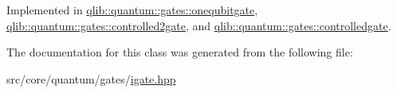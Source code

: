 Implemented in \hyperlink{classqlib_1_1quantum_1_1gates_1_1onequbitgate_a280c7a7d29032eeb95afcb3d6668e7db}{qlib\+::quantum\+::gates\+::onequbitgate}, \hyperlink{classqlib_1_1quantum_1_1gates_1_1controlled2gate_a272635da6a7b8f65379f6ecb42df9389}{qlib\+::quantum\+::gates\+::controlled2gate}, and \hyperlink{classqlib_1_1quantum_1_1gates_1_1controlledgate_aec6e423cc6ae442c5c3c5dc04581959e}{qlib\+::quantum\+::gates\+::controlledgate}.



The documentation for this class was generated from the following file\+:\begin{DoxyCompactItemize}
\item 
src/core/quantum/gates/\hyperlink{igate_8hpp}{igate.\+hpp}\end{DoxyCompactItemize}
